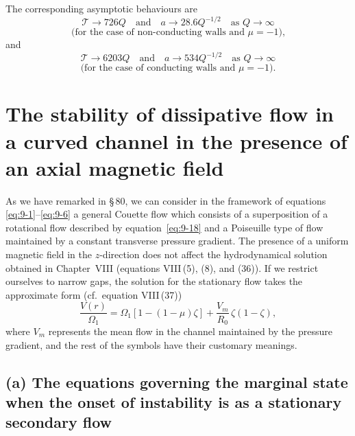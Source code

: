 The corresponding asymptotic behaviours are
\begin{equation}
\mathscr{T} \to 726Q \quad \text{and} \quad a \to 28.6 Q^{-1/2} \quad \text{as } Q \to \infty \label{eq:9-298}
\end{equation}
\[
\text{(for the case of non-conducting walls and } \mu = -1\text{),}
\]
and
\begin{equation}
\mathscr{T} \to 6203 Q \quad \text{and} \quad a \to 534 Q^{-1/2} \quad \text{as } Q \to \infty \label{eq:9-299}
\end{equation}
\[
\text{(for the case of conducting walls and } \mu = -1\text{).}
\]

\section{The stability of dissipative flow in a curved channel in the presence of an axial magnetic field}
\label{sec:88}

As we have remarked in \S\,80, we can consider in the framework of equations \eqref{eq:9-1}--\eqref{eq:9-6} a general Couette flow which consists of a superposition of a rotational flow described by equation~\eqref{eq:9-18} and a Poiseuille type of flow maintained by a constant transverse pressure gradient. The presence of a uniform magnetic field in the $z$-direction does not affect the hydrodynamical solution obtained in Chapter~VIII (equations VIII\,(5), (8), and (36)). If we restrict ourselves to narrow gaps, the solution for the stationary flow takes the approximate form (cf.\ equation VIII\,(37))
\begin{equation}
\frac{V(r)}{\Omega_1} = \Omega_1[1 - (1 - \mu)\zeta] + \frac{V_m}{R_0}\,\zeta(1 - \zeta), \label{eq:9-300}
\end{equation}
where $V_m$ represents the mean flow in the channel maintained by the pressure gradient, and the rest of the symbols have their customary meanings.

\subsection*{(a) The equations governing the marginal state when the onset of instability is as a stationary secondary flow}

